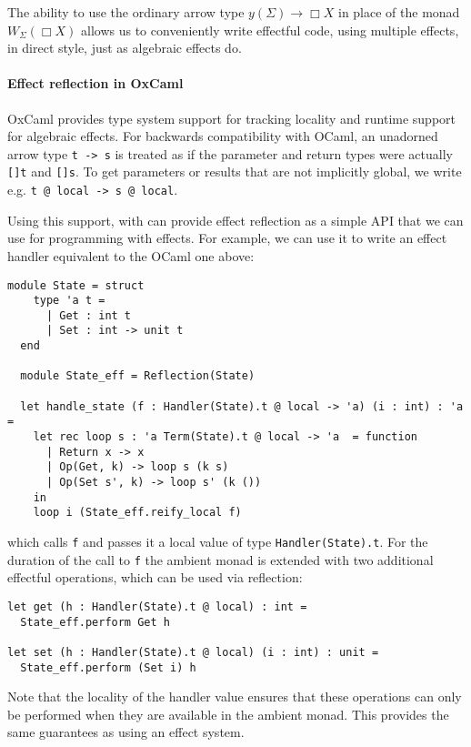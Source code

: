 \documentclass[acmsmall, screen, nonacm]{acmart}
\theoremstyle{definition}
\newcommand{\glob}{\mathop{\Box}}
\newcommand{\yoneda}[1]{y(#1)}
\newcommand{\ind}[1]{W_{#1}}
\begin{document}
The ability to use the ordinary arrow type
$\yoneda{\Sigma} \mathbin{\rightarrow} \glob X$ in place of the monad
$\ind{\Sigma}(\glob X)$ allows us to conveniently write effectful code,
using multiple effects, in direct style, just as algebraic effects do.

\paragraph{Effect reflection in OxCaml}
OxCaml\cite{lorenzen2024oxidizing} provides type system support for
tracking locality and runtime support for algebraic effects. For
backwards compatibility with OCaml, an unadorned arrow type
\lstinline[style=oxcaml]{t -> s} is treated as if the parameter and
return types were actually \lstinline[style=oxcaml]{[]t} and
\lstinline[style=oxcaml]{[]s}. To get parameters or results that are not
implicitly global, we write
e.g. \lstinline[style=oxcaml]{t @ local -> s @ local}.

Using this support, with can provide effect reflection as a simple API
that we can use for programming with effects.  For example, we can use
it to write an effect handler equivalent to the OCaml one above:
\begin{lstlisting}[style=oxcaml]
  module State = struct
    type 'a t =
      | Get : int t
      | Set : int -> unit t
  end

  module State_eff = Reflection(State)

  let handle_state (f : Handler(State).t @ local -> 'a) (i : int) : 'a =
    let rec loop s : 'a Term(State).t @ local -> 'a  = function
      | Return x -> x
      | Op(Get, k) -> loop s (k s)
      | Op(Set s', k) -> loop s' (k ())
    in
    loop i (State_eff.reify_local f)
\end{lstlisting}
which calls \lstinline[style=oxcaml]{f} and passes it a local value of
type \lstinline[style=oxcaml]{Handler(State).t}. For the duration of the
call to \lstinline[style=oxcaml]{f} the ambient monad is extended with
two additional effectful operations, which can be used via reflection:
\begin{lstlisting}[style=oxcaml]
let get (h : Handler(State).t @ local) : int =
  State_eff.perform Get h

let set (h : Handler(State).t @ local) (i : int) : unit =
  State_eff.perform (Set i) h
\end{lstlisting}

Note that the locality of the handler value ensures that these
operations can only be performed when they are available in the ambient
monad. This provides the same guarantees as using an effect system.
\end{document}
